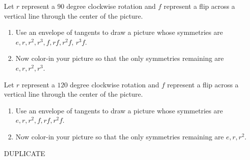 \documentclass[noauthor,nooutcomes,12pt,hints]{ximera}
\begin{document}
\begin{question}
  Let $r$ represent a $90$ degree clockwise rotation and $f$
  represent a flip across a vertical line through the center of the
  picture.  
 \begin{enumerate}
 \item Use an envelope of tangents to draw a picture whose symmetries
   are $e,r,r^2,r^3,f,rf,r^2f$, $r^3f$.
 \item Now color-in your picture so that the only symmetries remaining
   are $e,r,r^2,r^3$.
 \end{enumerate}
\end{question}
\mynewpage



\begin{question}
  Let $r$ represent a $120$ degree clockwise rotation and $f$
  represent a flip across a vertical line through the center of the
  picture.  
 \begin{enumerate}
 \item Use an envelope of tangents to draw a picture whose symmetries
   are $e,r,r^2,f,rf,r^2f$.
 \item Now color-in your picture so that the only symmetries remaining
   are $e,r,r^2$.
 \end{enumerate}
 \begin{freeResponse}
   DUPLICATE
 \end{freeResponse}
\end{question}
\mynewpage
\end{document}
